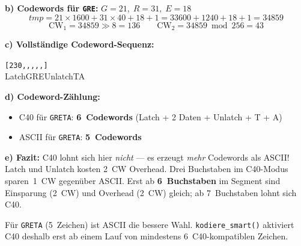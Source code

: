 \textbf{b) Codewords für \texttt{GRE}:}
$G=21,\; R=31,\; E=18$
\[
  \mathit{tmp} = 21 \times 1600 + 31 \times 40 + 18 + 1
              = 33600 + 1240 + 18 + 1 = 34859
\]
\[
  \text{CW}_1 = 34859 \gg 8 = 136 \qquad
  \text{CW}_2 = 34859 \bmod 256 = 43
\]

\textbf{c) Vollständige Codeword-Sequenz:}
\begin{center}
\texttt{[230,,,,,]}\\
{\small Latch\quad GRE\quad\quad Unlatch\quad T\quad A}
\end{center}

\textbf{d) Codeword-Zählung:}
\begin{itemize}
\item C40 für \texttt{GRETA}: \textbf{6~Codewords}
  (Latch + 2 Daten + Unlatch + T + A)
\item ASCII für \texttt{GRETA}: \textbf{5~Codewords}
\end{itemize}

\textbf{e) Fazit:}
C40 lohnt sich hier \emph{nicht} — es erzeugt \emph{mehr} Codewords als ASCII!
Latch und Unlatch kosten 2~CW Overhead. Drei Buchstaben im C40-Modus
sparen~1~CW gegenüber ASCII. Erst ab \textbf{6~Buchstaben} im Segment
sind Einsparung (2~CW) und Overhead (2~CW) gleich; ab 7~Buchstaben
lohnt sich C40.

Für \texttt{GRETA} (5~Zeichen) ist ASCII die bessere Wahl.
\texttt{kodiere\_smart()} aktiviert C40 deshalb erst ab einem Lauf
von mindestens 6~C40-kompatiblen Zeichen.
